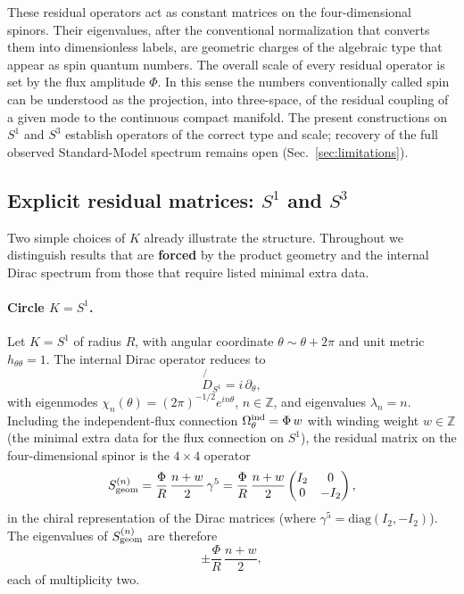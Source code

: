 \documentclass[11pt,a4paper]{article}
\begin{document}
These residual operators act as constant matrices on the four-dimensional spinors. Their eigenvalues, after the conventional normalization that converts them into dimensionless labels, are geometric charges of the algebraic type that appear as spin quantum numbers. The overall scale of every residual operator is set by the flux amplitude \(\Phi\). In this sense the numbers conventionally called spin can be understood as the projection, into three-space, of the residual coupling of a given mode to the continuous compact manifold. The present constructions on \(S^1\) and \(S^3\) establish operators of the correct type and scale; recovery of the full observed Standard-Model spectrum remains open (Sec.~\ref{sec:limitations}).

\subsection{Explicit residual matrices: \(S^1\) and \(S^3\)}
\label{sec:explicit-spectra}

Two simple choices of \(K\) already illustrate the structure. Throughout we distinguish results that are \textbf{forced} by the product geometry and the internal Dirac spectrum from those that require listed minimal extra data.

\paragraph{Circle \(K=S^1\).}
Let \(K=S^1\) of radius \(R\), with angular coordinate \(\theta\sim\theta+2\pi\) and unit metric \(h_{\theta\theta}=1\). The internal Dirac operator reduces to
\begin{equation}
\not{D}_{S^1}=i\,\partial_\theta,
\end{equation}
with eigenmodes \(\chi_n(\theta)=(2\pi)^{-1/2}e^{in\theta}\), \(n\in\mathbb{Z}\), and eigenvalues \(\lambda_n=n\). Including the independent-flux connection \(\Omega_\theta^{\rm ind}=\Phi\,w\) with winding weight \(w\in\mathbb{Z}\) (the minimal extra data for the flux connection on \(S^1\)), the residual matrix on the four-dimensional spinor is the \(4\times4\) operator
\begin{equation}
S_{\rm geom}^{(n)}
=\frac{\Phi}{R}\,\frac{n+w}{2}\,\gamma^5
=
\frac{\Phi}{R}\,\frac{n+w}{2}
\begin{pmatrix}
I_2 & 0 \\
0 & -I_2
\end{pmatrix},
\label{eq:Sgeom-S1}
\end{equation}
in the chiral representation of the Dirac matrices (where \(\gamma^5=\mathrm{diag}(I_2,-I_2)\)). The eigenvalues of \(S_{\rm geom}^{(n)}\) are therefore
\begin{equation}
\pm\frac{\Phi}{R}\,\frac{n+w}{2},
\end{equation}
each of multiplicity two.
\end{document}
